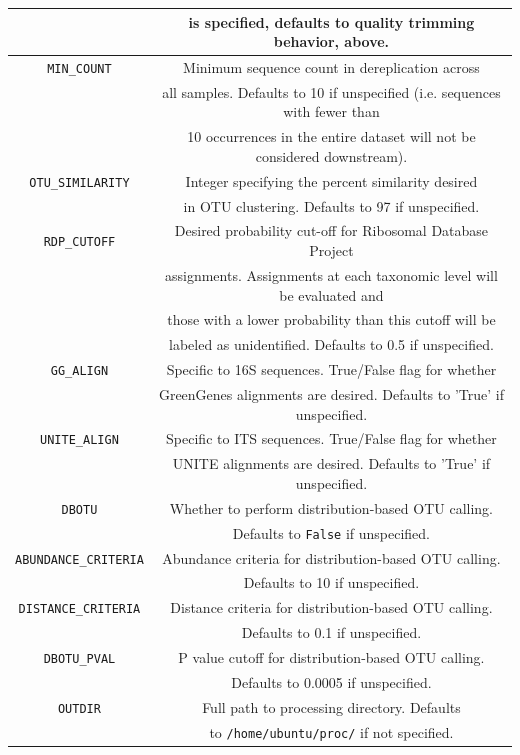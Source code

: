 \documentclass[11pt, oneside]{article}   	%
\begin{document}
\begin{center}
\begin{longtable}{| c | c |}
		& is specified, defaults to quality trimming behavior, above. \\
		\hline
        {\tt MIN\_COUNT} & Minimum sequence count in dereplication across \\
        & all samples.  Defaults to 10 if unspecified (i.e. sequences with fewer than  \\
        & 10 occurrences in the entire dataset will not be considered downstream). \\
        \hline
        {\tt OTU\_SIMILARITY} & Integer specifying the percent similarity desired \\
         &  in OTU clustering.  Defaults to 97 if unspecified. \\
	\hline
	{\tt RDP\_CUTOFF} & Desired probability cut-off for Ribosomal Database Project \\
	& assignments.  Assignments at each taxonomic level will be evaluated and \\
	& those with a lower probability than this cutoff will be \\
	& labeled as unidentified. Defaults to 0.5 if unspecified. \\
	\hline
	{\tt GG\_ALIGN} & Specific to 16S sequences.  True/False flag for whether \\
	& GreenGenes alignments are desired.  Defaults to 'True' if unspecified. \\
	\hline
	{\tt UNITE\_ALIGN} & Specific to ITS sequences.  True/False flag for whether \\
	& UNITE alignments are desired.  Defaults to 'True' if unspecified. \\
	\hline
        {\tt DBOTU} & Whether to perform distribution-based OTU calling. \\
         &  Defaults to {\tt False} if unspecified. \\
	\hline
        {\tt ABUNDANCE\_CRITERIA} & Abundance criteria for distribution-based OTU calling. \\
         &  Defaults to 10 if unspecified. \\
	\hline
        {\tt DISTANCE\_CRITERIA} & Distance criteria for distribution-based OTU calling. \\
         &  Defaults to 0.1 if unspecified. \\
	\hline
        {\tt DBOTU\_PVAL} & P value cutoff for distribution-based OTU calling. \\
         &  Defaults to 0.0005 if unspecified. \\
	\hline
	{\tt OUTDIR} & Full path to processing directory. Defaults \\
	& to {\tt /home/ubuntu/proc/} if not specified. \\
	\hline
\end{longtable}
\end{center}
\end{document}
